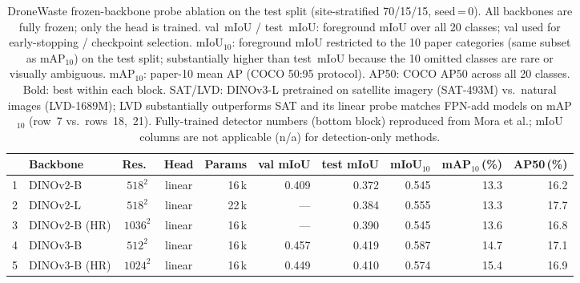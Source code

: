 

\begin{table}[t]
\centering
\caption{%
  DroneWaste frozen-backbone probe ablation on the test split
  (site-stratified 70/15/15, seed\,=\,0). All backbones are fully frozen;
  only the head is trained.
  val~mIoU / test~mIoU: foreground mIoU over all 20 classes;
  val used for early-stopping / checkpoint selection.
  mIoU$_{10}$: foreground mIoU restricted to the 10 paper categories
  (same subset as mAP$_{10}$) on the test split; substantially higher than
  test~mIoU because the 10 omitted classes are rare or visually ambiguous.
  mAP$_{10}$: paper-10 mean AP (COCO 50:95 protocol).
  AP50: COCO AP50 across all 20 classes.
  Bold: best within each block.
  SAT/LVD: DINOv3-L pretrained on satellite imagery (SAT-493M) vs.\ natural
  images (LVD-1689M); LVD substantially outperforms SAT and its linear probe
  matches FPN-add models on mAP$_{10}$ (row~7 vs.\ rows~18,~21).
  Fully-trained detector numbers (bottom block) reproduced from Mora et al.;
  mIoU columns are not applicable (n/a) for detection-only methods.
}
\label{tab:dw-ablation}
\setlength{\tabcolsep}{5pt}
\begin{tabular}{clccr rrrrr}
\toprule
   & Backbone               & Res.\        & Head   & Params
   & val mIoU & test mIoU & mIoU$_{10}$ & mAP$_{10}$\,(\%) & AP50\,(\%) \\
\midrule
 1 & DINOv2-B               & $518^2$      & linear  & 16\,k        & 0.409 & 0.372 & 0.545 & 13.3 & 16.2 \\
 2 & DINOv2-L               & $518^2$      & linear  & 22\,k        & ---   & 0.384 & 0.555 & 13.3 & 17.7 \\
 3 & DINOv2-B (HR)          & $1036^2$     & linear  & 16\,k        & ---   & 0.390 & 0.545 & 13.6 & 16.8 \\
\midrule
 4 & DINOv3-B               & $512^2$      & linear  & 16\,k        & 0.457 & 0.419 & 0.587 & 14.7 & 17.1 \\
 5 & DINOv3-B (HR)          & $1024^2$     & linear  & 16\,k        & 0.449 & 0.410 & 0.574 & 15.4 & 16.9 \\

\end{tabular}
\end{table}
